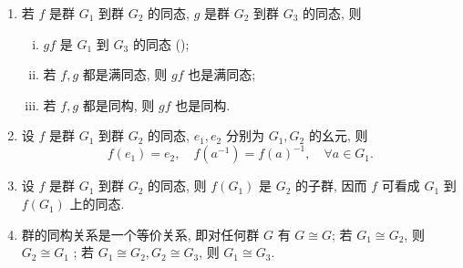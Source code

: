 \documentclass[../../main.tex]{subfiles}%
\begin{document}
\begin{theorem}[群同态与同构的基本性质]\label{theorem:群同态与同构的基本性质}
\begin{enumerate}[(1)]
\item\label{theorem:群同态与同构的基本性质-1} 若 \( f \) 是群 \( G_1 \) 到群 \( G_2 \) 的同态, \( g \) 是群 \( G_2 \) 到群 \( G_3 \) 的同态, 则
\begin{enumerate}[(i)]
\item \( gf \) 是 \( G_1 \) 到 \( G_3 \) 的同态 ();
\item 若 \( f,g \) 都是满同态, 则 \( gf \) 也是满同态;
\item 若 \( f,g \) 都是同构, 则 \( gf \) 也是同构.
\end{enumerate}

\item\label{theorem:群同态与同构的基本性质-2} 设 \( f \) 是群 \( G_1 \) 到群 \( G_2 \) 的同态, \( e_1,e_2 \) 分别为 \( G_1,G_2 \) 的幺元, 则
\[
f(e_1) = e_2, \quad f(a^{-1}) = f(a)^{-1}, \quad \forall a \in G_1.
\]

\item\label{theorem:群同态与同构的基本性质-3} 设 \( f \) 是群 \( G_1 \) 到群 \( G_2 \) 的同态, 则 \( f(G_1) \) 是 \( G_2 \) 的子群, 因而 \( f \) 可看成 \( G_1 \) 到 \( f(G_1) \) 上的同态.

\item\label{theorem:群同态与同构的基本性质-4}  群的同构关系是一个等价关系, 即对任何群 \( G \) 有 \( G \cong G \); 若 \( G_1 \cong G_2 \), 则 \( G_2 \cong G_1 \) ; 若 \( G_1 \cong G_2, G_2 \cong G_3 \), 则 \( G_1 \cong G_3 \).
\end{enumerate}
\end{theorem}
\begin{figure}[H]
\centering
\caption{}
\label{figure:交换图2}
\end{figure}
\end{document}
